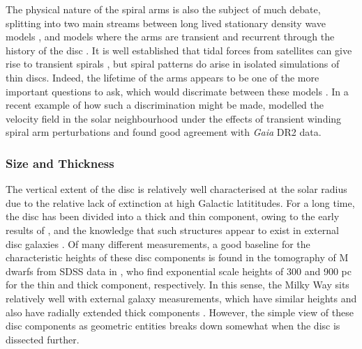 The physical nature of the spiral arms is also the subject of much debate, splitting into two main streams between long lived stationary density wave models \citep[e.g.][]{1964ApJ...140..646L,1996ssgd.book.....B}, and models where the arms are transient and recurrent through the history of the disc \citep[e.g.][]{1981seng.proc..111T,1984ApJ...282...61S}. It is well established that tidal forces from satellites can give rise to transient spirals \citep[e.g.][]{2010MNRAS.403..625D}, but spiral patterns do arise in isolated simulations of thin discs. Indeed, the lifetime of the arms appears to be one of the more important questions to ask, which would discrimate between these models \citep{2011MNRAS.410.1637S}. In a recent example of how such a discrimination might be made, \citet{2018MNRAS.481.3794H} modelled the velocity field in the solar neighbourhood under the effects of transient winding spiral arm perturbations and found good agreement with \emph{Gaia} DR2 data. 

\subsubsection{Size and Thickness}
\label{sec:discsize}
The vertical extent of the disc is relatively well characterised at the solar radius due to the relative lack of extinction at high Galactic latititudes. For a long time, the disc has been divided into a thick and thin component, owing to the early results of \citet{1983MNRAS.202.1025G}, and the knowledge that such structures appear to exist in external disc galaxies \citep[e.g.][]{1979ApJ...234..829B,1979ApJ...234..842T,2006AJ....131..226Y}. Of many different measurements, a good baseline for the characteristic heights of these disc components is found in the tomography of M dwarfs from SDSS data in \citet{2008ApJ...673..864J}, who find exponential scale heights of 300 and 900 pc for the thin and thick component, respectively. In this sense, the Milky Way sits relatively well with external galaxy measurements, which have similar heights and also have radially extended thick components \citep[e.g][]{2006AJ....131..226Y}. However, the simple view of these disc components as geometric entities breaks down somewhat when the disc is dissected further.

